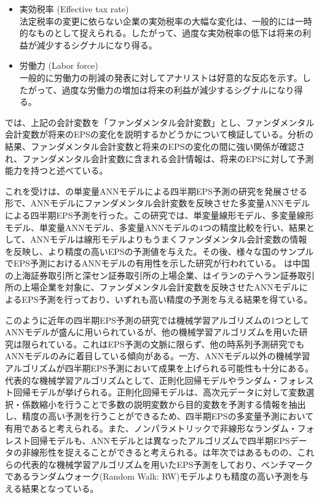 \documentclass[a4paper, 12pt]{jsreport}
\begin{document}
\begin{itemize}
\item 実効税率 (Effective tax rate) \\
    法定税率の変更に依らない企業の実効税率の大幅な変化は、一般的には一時的なものとして捉えられる。したがって、過度な実効税率の低下は将来の利益が減少するシグナルになり得る。

\item 労働力 (Labor force) \\
    一般的に労働力の削減の発表に対してアナリストは好意的な反応を示す。したがって、過度な労働力の増加は将来の利益が減少するシグナルになり得る。
\end{itemize}

\cite*{abarbanell1997fundamental}では、上記の会計変数を「ファンダメンタル会計変数」とし、ファンダメンタル会計変数が将来のEPSの変化を説明するかどうかについて検証している。分析の結果、ファンダメンタル会計変数と将来のEPSの変化の間に強い関係が確認され、ファンダメンタル会計変数に含まれる会計情報は、将来のEPSに対して予測能力を持つと述べている。

これを受け\cite{zhang2004neural}は、\cite{callen1996neural}の単変量ANNモデルによる四半期EPS予測の研究を発展させる形で、ANNモデルにファンダメンタル会計変数を反映させた多変量ANNモデルによる四半期EPS予測を行った。この研究では、単変量線形モデル、多変量線形モデル、単変量ANNモデル、多変量ANNモデルの4つの精度比較を行い、結果として、ANNモデルは線形モデルよりもうまくファンダメンタル会計変数の情報を反映し、より精度の高いEPSの予測値を与えた。その後、様々な国のサンプルでEPS予測におけるANNモデルの有用性を示した研究が行われている。\cite*{cao2009forecasting} は中国の上海証券取引所と深セン証券取引所の上場企業、\cite{etemadi2015earnings}はイランのテヘラン証券取引所の上場企業を対象に、ファンダメンタル会計変数を反映させたANNモデルによるEPS予測を行っており、いずれも高い精度の予測を与える結果を得ている。

このように近年の四半期EPS予測の研究では機械学習アルゴリズムの1つとしてANNモデルが盛んに用いられているが、他の機械学習アルゴリズムを用いた研究は限られている。これはEPS予測の文脈に限らず、他の時系列予測研究でもANNモデルのみに着目している傾向がある\citep{ahmed2010empirical}。一方、ANNモデル以外の機械学習アルゴリズムが四半期EPS予測において成果を上げられる可能性も十分にある。代表的な機械学習アルゴリズムとして、正則化回帰モデルやランダム・フォレスト回帰モデルが挙げられる\citep{hastie2009esl}。正則化回帰モデルは、高次元データに対して変数選択・係数縮小を行うことで多数の説明変数から目的変数を予測する情報を抽出し、精度の高い予測を行うことができるため、四半期EPSの多変量予測において有用であると考えられる。また、ノンパラメトリックで非線形なランダム・フォレスト回帰モデル\citep{breiman2001random}も、ANNモデルとは異なったアルゴリズムで四半期EPSデータの非線形性を捉えることができると考えられる。\cite*{cao2020fundamental}は年次ではあるものの、これらの代表的な機械学習アルゴリズムを用いたEPS予測をしており、ベンチマークであるランダムウォーク(Random Walk: RW)モデルよりも精度の高い予測を与える結果となっている。
\end{document}
